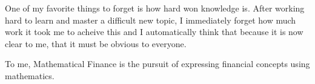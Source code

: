 
One of my favorite things to forget is how hard won knowledge is.
After working hard to learn and master a difficult new topic, I
immediately forget how much work it took me to acheive this and
I automatically think that because it is now clear to me, that
it must be obvious to everyone.

To me, Mathematical Finance is the pursuit of expressing financial
concepts using mathematics.